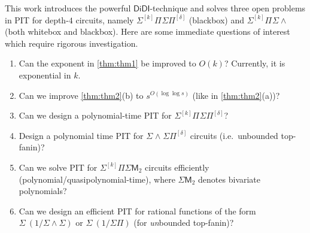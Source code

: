 \documentclass[10pt,a4paper]{article}
\newcommand{\DiDI}{\mathsf{DiDI}}
\newcommand{\SPSP}[3]{\Sigma^{#1}\Pi^{#2}\Sigma\Pi^{#3}}
\newcommand{\SWSP}[3]{\Sigma^{#1}\!\wedge^{#2}\!\Sigma\Pi^{#3}}
\newcommand{\SPSU}[3]{\Sigma^{#1} \Pi^{#2} \Sigma \wedge^{#3}}
\numberwithin{equation}{section}
\begin{document}
This work introduces the powerful $\DiDI$-technique and solves three open problems in PIT for depth-$4$ circuits, namely $\SPSP{[k]}{}{[\delta]}$ (blackbox) and $\SPSU{[k]}{}{}$ (both whitebox and blackbox). Here are some immediate questions of interest which require rigorous investigation.
\begin{enumerate}
	\item Can the exponent in \autoref{thm:thm1} be improved to $O(k)$? Currently, it is exponential in $k$.    
    \item Can we improve \autoref{thm:thm2}(b) to $s^{O(\log \log s)}$ (like in \autoref{thm:thm2}(a))?
    \item Can we design a polynomial-time PIT for $\SPSP{[k]}{}{[\delta]}$?
    \item Design a polynomial time PIT for $\SWSP{}{}{[\delta]}$ circuits (i.e.~unbounded top-fanin)? 
    \item Can we solve PIT for $\Sigma^{[k]}\Pi\Sigma\mathsf{M}_2$ circuits efficiently (polynomial/quasipolynomial-time), where \(\Sigma\mathsf{M}_2\) denotes bivariate polynomials?    
    \item Can we design an efficient PIT for rational functions of the form $\Sigma^{}\,(1/\Sigma\wedge\Sigma)$ or $\Sigma^{}\,(1/\Sigma\Pi)$ (for {\em un}bounded top-fanin)?
\end{enumerate}
\end{document}
